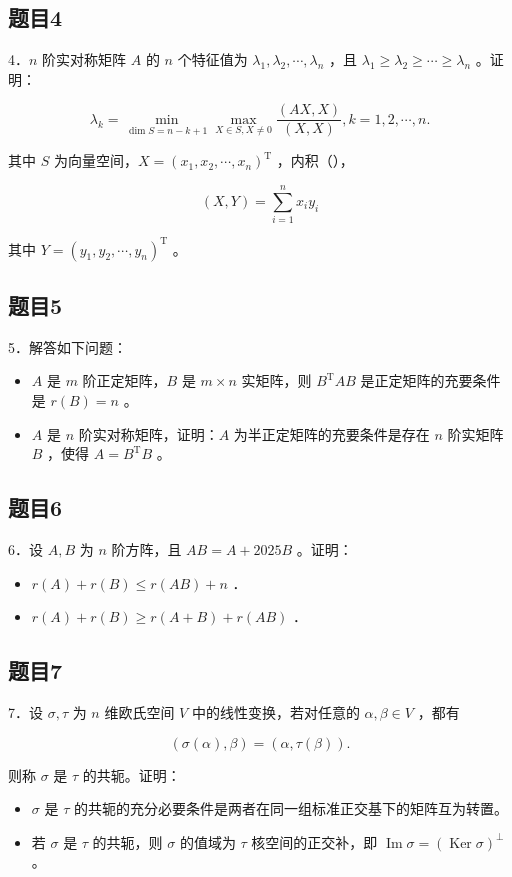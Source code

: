 \documentclass{article}
\begin{document}
\subsection{题目4}
4．\(n\) 阶实对称矩阵 \(A\) 的 \(n\) 个特征值为 \(\lambda_{1}, \lambda_{2}, \cdots, \lambda_{n}\) ，且 \(\lambda_{1} \geq \lambda_{2} \geq \cdots \geq \lambda_{n}\) 。证明：

\[
\lambda_{k}=\min _{\operatorname{dim} S=n-k+1} \max _{X \in S, X \neq 0} \frac{(A X, X)}{(X, X)}, k=1,2, \cdots, n .
\]

其中 \(S\) 为向量空间，\(X=\left(x_{1}, x_{2}, \cdots, x_{n}\right)^{\mathrm{T}}\) ，内积（），

\[
(X, Y)=\sum_{i=1}^{n} x_{i} y_{i}
\]

其中 \(Y=\left(y_{1}, y_{2}, \cdots, y_{n}\right)^{\mathrm{T}}\) 。

\subsection{题目5}
5．解答如下问题：

\begin{itemize}
  \item[（1）] \(A\) 是 \(m\) 阶正定矩阵，\(B\) 是 \(m \times n\) 实矩阵，则 \(B^{\mathrm{T}} A B\) 是正定矩阵的充要条件是 \(r(B)=n\) 。
  \item[（2）] \(A\) 是 \(n\) 阶实对称矩阵，证明：\(A\) 为半正定矩阵的充要条件是存在 \(n\) 阶实矩阵 \(B\) ，使得 \(A=B^{\mathrm{T}} B\) 。
\end{itemize}

\subsection{题目6}
6．设 \(A, B\) 为 \(n\) 阶方阵，且 \(A B=A+2025 B\) 。证明：

\begin{itemize}
  \item[（1）] \(r(A)+r(B) \leq r(A B)+n\) ．
  \item[（2）] \(r(A)+r(B) \geq r(A+B)+r(A B)\) ．
\end{itemize}

\subsection{题目7}
7．设 \(\sigma, \tau\) 为 \(n\) 维欧氏空间 \(V\) 中的线性变换，若对任意的 \(\alpha, \beta \in V\) ，都有

\[
(\sigma(\alpha), \beta)=(\alpha, \tau(\beta)) .
\]

则称 \(\sigma\) 是 \(\tau\) 的共轭。证明：

\begin{itemize}
  \item[（1）] \(\sigma\) 是 \(\tau\) 的共轭的充分必要条件是两者在同一组标准正交基下的矩阵互为转置。
  \item[（2）] 若 \(\sigma\) 是 \(\tau\) 的共轭，则 \(\sigma\) 的值域为 \(\tau\) 核空间的正交补，即 \(\operatorname{Im} \sigma=(\operatorname{Ker} \sigma)^{\perp}\) 。
\end{itemize}
\end{document}
